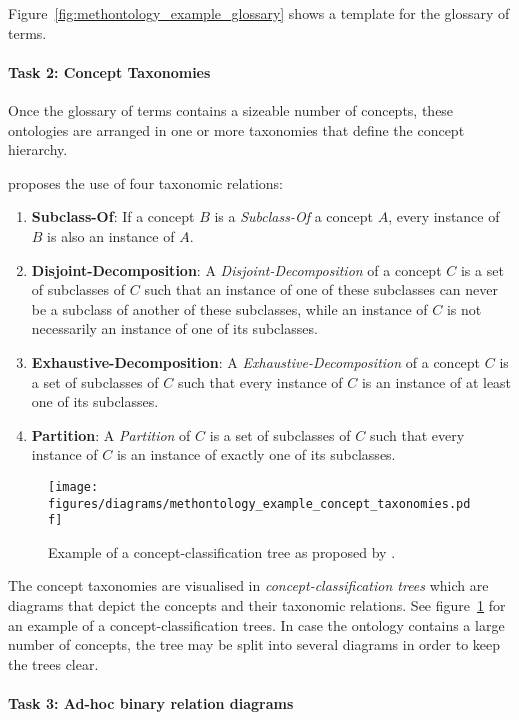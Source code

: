 Figure~\ref{fig:methontology_example_glossary} shows a template for the glossary of terms.

\paragraph{Task 2: Concept Taxonomies}

Once the glossary of terms contains a sizeable number of concepts, these ontologies are arranged in one or more taxonomies that define the concept hierarchy.

\methontology proposes the use of four taxonomic relations:
\begin{enumerate}
  \item \textbf{Subclass-Of}: If a concept $B$ is a \emph{Subclass-Of} a concept $A$, every instance of $B$ is also an instance of $A$.
  \item \textbf{Disjoint-Decomposition}: A \emph{Disjoint-Decomposition} of a concept $C$ is a set of subclasses of $C$ such that an instance of one of these subclasses can never be a subclass of another of these subclasses, while an instance of $C$ is not necessarily an instance of one of its subclasses.
  \item \textbf{Exhaustive-Decomposition}: A \emph{Exhaustive-Decomposition} of a concept $C$ is a set of subclasses of $C$ such that every instance of $C$ is an instance of at least one of its subclasses.
  \item \textbf{Partition}: A \emph{Partition} of $C$ is a set of subclasses of $C$ such that every instance of $C$ is an instance of exactly one of its subclasses.
\end{enumerate}

\begin{figure}
\centering
\texttt{[image: figures/diagrams/methontology\_example\_concept\_taxonomies.pdf]}
\caption{Example of a concept-classification tree as proposed by \methontology.}
\label{fig:methontology_example_concept_taxonomies}
\end{figure}

The concept taxonomies are visualised in \emph{concept-classification trees} which are diagrams that depict the concepts and their taxonomic relations. See figure~\ref{fig:methontology_example_concept_taxonomies} for an example of a concept-classification trees. In case the ontology contains a large number of concepts, the tree may be split into several diagrams in order to keep the trees clear.

\paragraph{Task 3: Ad-hoc binary relation diagrams}

